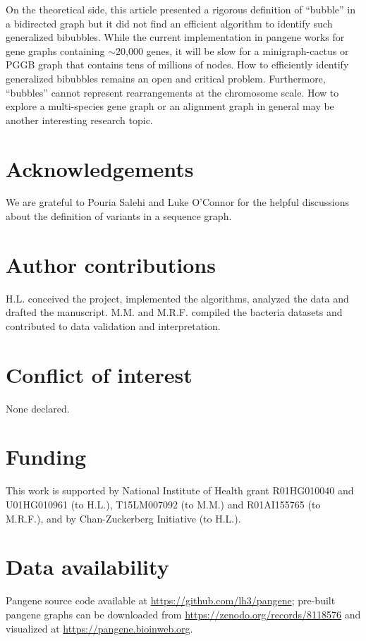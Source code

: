 \documentclass[webpdf,contemporary,large,namedate]{oup-authoring-template}%
\begin{document}
On the theoretical side, this article presented a rigorous definition of ``bubble'' in a bidirected graph
but it did not find an efficient algorithm to identify such generalized bibubbles.
While the current implementation in pangene works for gene graphs containing $\sim$20,000 genes,
it will be slow for a minigraph-cactus or PGGB graph that contains tens of millions of nodes.
How to efficiently identify generalized bibubbles remains an open and critical problem.
Furthermore, ``bubbles'' cannot represent rearrangements at the chromosome scale.
How to explore a multi-species gene graph or an alignment graph in general
may be another interesting research topic.

\section*{Acknowledgements}

We are grateful to Pouria Salehi and Luke O'Connor for the helpful discussions about the definition of variants in a sequence graph.

\section*{Author contributions}

H.L. conceived the project, implemented the algorithms, analyzed the data and drafted the manuscript.
M.M. and M.R.F. compiled the bacteria datasets and contributed to data validation and interpretation.

\section*{Conflict of interest}

None declared.

\section*{Funding}

This work is supported by National Institute of Health grant R01HG010040 and U01HG010961 (to H.L.),
T15LM007092 (to M.M.) and R01AI155765 (to M.R.F.),
and by Chan-Zuckerberg Initiative (to H.L.).

\section*{Data availability}

Pangene source code available at \url{https://github.com/lh3/pangene};
pre-built pangene graphs can be downloaded from \url{https://zenodo.org/records/8118576}
and visualized at \url{https://pangene.bioinweb.org}.


{\sffamily\small
}
\end{document}
